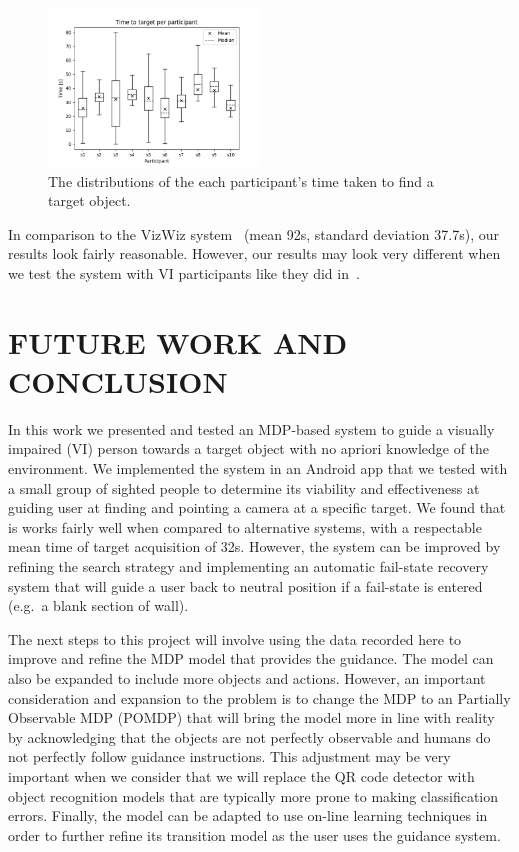 \documentclass[a4paper, twoside]{article}
\begin{document}
\begin{figure}
  \centering
  \includegraphics[width=0.5\textwidth]{figures/boxplot_time_to_target_subjects.png}
  \caption{The distributions of the each participant's time taken to find a target object. }\label{fig:time-participants}
\end{figure}

In comparison to the VizWiz system~\cite{bigham2010vizwiz} (mean 92s, standard deviation 37.7s), our results look fairly reasonable. However, our results may look very different when we test the system with VI participants like they did in~\cite{bigham2010vizwiz}.

\section{\uppercase{Future Work and Conclusion}}\label{sec:conclusion}

\noindent In this work we presented and tested an MDP-based system to guide a visually impaired (VI) person towards a target object with no apriori knowledge of the environment. We implemented the system in an Android app that we tested with a small group of sighted people to determine its viability and effectiveness at guiding user at finding and pointing a camera at a specific target. We found that is works fairly well when compared to alternative systems, with a respectable mean time of target acquisition of 32s. However, the system can be improved by refining the search strategy and implementing an automatic fail-state recovery system that will guide a user back to neutral position if a fail-state is entered (e.g.\ a blank section of wall). 

The next steps to this project will involve using the data recorded here to improve and refine the MDP model that provides the guidance. The model can also be expanded to include more objects and actions. However, an important consideration and expansion to the problem is to change the MDP to an Partially Observable MDP (POMDP) that will bring the model more in line with reality by acknowledging that the objects are not perfectly observable and humans do not perfectly follow guidance instructions. This adjustment may be very important when we consider that we will replace the QR code detector with object recognition models that are typically more prone to making classification errors. Finally, the model can be adapted to use on-line learning techniques in order to further refine its transition model as the user uses the guidance system. 

\clearpage


\end{document}
